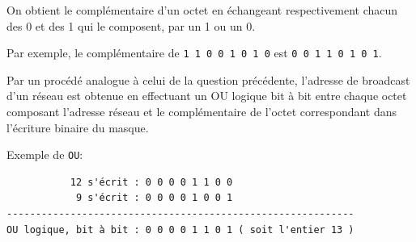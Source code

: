 On obtient le complémentaire d'un octet en échangeant respectivement chacun des 0 et des 1 qui le composent, par un 1 ou un 0.

Par exemple, le complémentaire de \verb|1 1 0 0 1 0 1 0| est \verb|0 0 1 1 0 1 0 1|.

Par un procédé analogue à celui de la question précédente, l'adresse de broadcast d'un réseau est obtenue en effectuant un OU logique bit à bit entre chaque octet composant l'adresse réseau et le complémentaire de l'octet correspondant dans l'écriture binaire du masque.

\medskip

Exemple de \texttt{OU}:
\begin{verbatim}   
           12 s'écrit : 0 0 0 0 1 1 0 0
            9 s'écrit : 0 0 0 0 1 0 0 1
------------------------------------------------------------
OU logique, bit à bit : 0 0 0 0 1 1 0 1 ( soit l'entier 13 )
\end{verbatim}

\pagebreak


